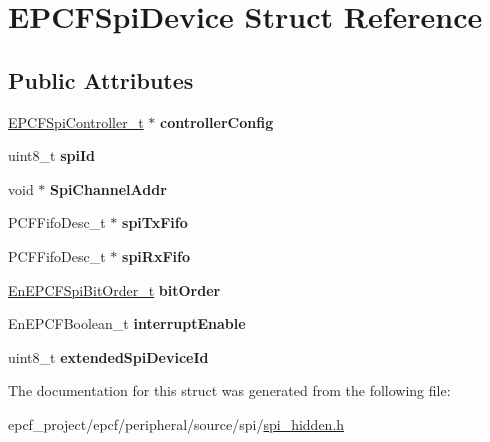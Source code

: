 \hypertarget{structEPCFSpiDevice}{}\section{E\+P\+C\+F\+Spi\+Device Struct Reference}
\label{structEPCFSpiDevice}
\subsection*{Public Attributes}
\begin{DoxyCompactItemize}
\item 
\mbox{\label{structEPCFSpiDevice_a147e3016227f0dcb210623aeb0956dbe}} 
\mbox{\hyperlink{structEPCFSpiController}{E\+P\+C\+F\+Spi\+Controller\+\_\+t}} $\ast$ {\bfseries controller\+Config}
\item 
\mbox{\label{structEPCFSpiDevice_a0c8954bb32cf615c7c4e737dd9d99044}} 
uint8\+\_\+t {\bfseries spi\+Id}
\item 
\mbox{\label{structEPCFSpiDevice_a94d4f82b6cd6f9ed96c5ee4c28cdf578}} 
void $\ast$ {\bfseries Spi\+Channel\+Addr}
\item 
\mbox{\label{structEPCFSpiDevice_add207bba65b27b4164cd7dcbffe19e4f}} 
P\+C\+F\+Fifo\+Desc\+\_\+t $\ast$ {\bfseries spi\+Tx\+Fifo}
\item 
\mbox{\label{structEPCFSpiDevice_a70c3c1a83b3c0f27f820dcabbccd693a}} 
P\+C\+F\+Fifo\+Desc\+\_\+t $\ast$ {\bfseries spi\+Rx\+Fifo}
\item 
\mbox{\label{structEPCFSpiDevice_a1457178a1e119b1dbbdd54ea4e5a3c7d}} 
\mbox{\hyperlink{spi_8h_a5669bc3ec8d7e355a15f0b6e37a0ff7b}{En\+E\+P\+C\+F\+Spi\+Bit\+Order\+\_\+t}} {\bfseries bit\+Order}
\item 
\mbox{\label{structEPCFSpiDevice_a080399425eef6d34f20ed2040831a39e}} 
En\+E\+P\+C\+F\+Boolean\+\_\+t {\bfseries interrupt\+Enable}
\item 
\mbox{\label{structEPCFSpiDevice_a0ccdf64c56fea6933b91b11dbeddabde}} 
uint8\+\_\+t {\bfseries extended\+Spi\+Device\+Id}
\end{DoxyCompactItemize}


The documentation for this struct was generated from the following file\+:\begin{DoxyCompactItemize}
\item 
epcf\+\_\+project/epcf/peripheral/source/spi/\mbox{\hyperlink{spi__hidden_8h}{spi\+\_\+hidden.\+h}}\end{DoxyCompactItemize}
